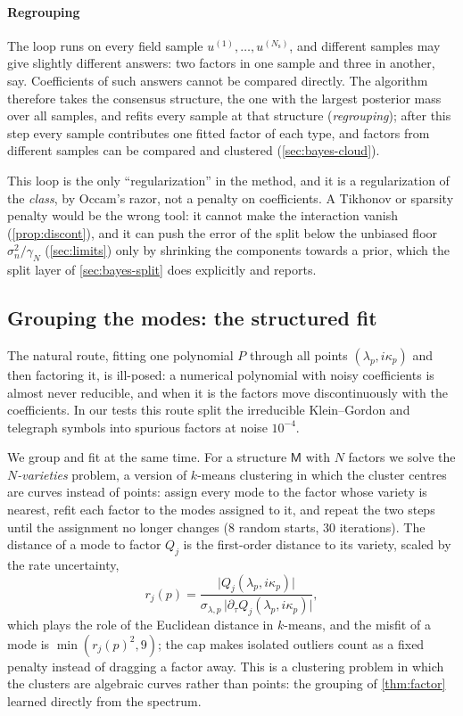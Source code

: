 \documentclass[11pt]{article}
\theoremstyle{plain}
\theoremstyle{definition}
\theoremstyle{remark}
\newcommand{\gN}{\gamma_{N}}                %
\newcommand{\noise}{\sigma_{n}}             %
\newcommand{\Nsamp}{N_{\mathrm s}}          %
\newcommand{\Mfit}{\mathsf{M}}              %
\newcommand{\abs}[1]{\lvert#1\rvert}
\begin{document}
\paragraph{Regrouping} The loop runs on every field sample $u^{(1)},\dots,u^{(\Nsamp)}$, and different samples may give
slightly different answers: two factors in one sample and three in another, say. Coefficients of such answers cannot be
compared directly. The algorithm therefore takes the consensus structure, the one with the largest posterior mass over
all samples, and refits every sample at that structure (\emph{regrouping}); after this step every sample contributes one
fitted factor of each type, and factors from different samples can be compared and clustered (\cref{sec:bayes-cloud}).

This loop is the only ``regularization'' in the method, and it is a regularization of the
\emph{class}, by Occam's razor, not a penalty on coefficients. A Tikhonov or sparsity penalty would be
the wrong tool: it cannot make the interaction vanish (\cref{prop:discont}), and it can push the error of the split
below the unbiased floor $\noise^2/\gN$ (\cref{sec:limits}) only by shrinking the components towards a prior, which the
split layer of \cref{sec:bayes-split} does explicitly and reports.



\subsection{Grouping the modes: the structured fit}\label{sec:alg-structfit}
The natural route, fitting one polynomial $P$ through all points $(\lambda_p,i\kappa_p)$ and then factoring
it, is ill-posed: a numerical polynomial with noisy coefficients is almost never reducible, and when it is
the factors move discontinuously with the coefficients. In our tests this route split the irreducible
Klein--Gordon and telegraph symbols into spurious factors at noise $10^{-4}$.

We group and fit at the same time. For a structure $\Mfit$ with $N$ factors we solve the
\emph{$N$-varieties} problem, a version of $k$-means clustering in which the cluster centres are curves instead of
points: assign every mode to the factor whose variety is nearest, refit each factor to the modes assigned to it, and
repeat the two steps until the assignment no longer changes (8 random starts, 30 iterations). The distance of a mode to factor $Q_j$ is
the first-order distance to its variety, scaled by the rate uncertainty,
\begin{equation}\label{eq:vardist}
  r_j(p)=\frac{\abs{Q_j(\lambda_p,i\kappa_p)}}{\sigma_{\lambda,p}\,\abs{\partial_\tau Q_j(\lambda_p,i\kappa_p)}},
\end{equation}
which plays the role of the Euclidean distance in $k$-means, and the misfit of a mode is $\min(r_j(p)^2,9)$; the cap makes isolated outliers count as a fixed
penalty instead of dragging a factor away. This is a clustering problem in which the clusters are
algebraic curves rather than points: the grouping of \cref{thm:factor} learned directly from the
spectrum.
\end{document}
